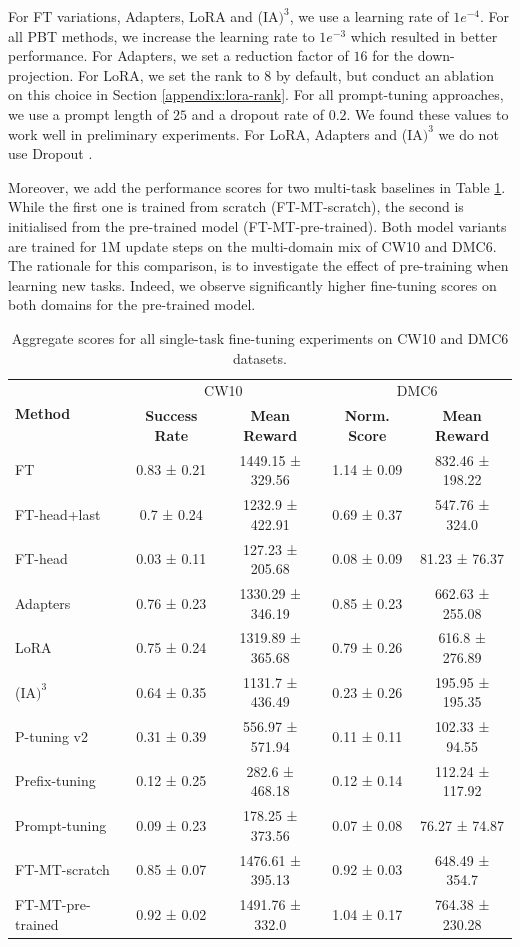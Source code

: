 For FT variations, Adapters, LoRA and (IA$\text{)}^3$, we use a learning rate of $1e^{-4}$. For all PBT methods, we increase the learning rate to $1e^{-3}$ which resulted in  better performance. For Adapters, we set a reduction factor of $16$ for the down-projection. For LoRA, we set the rank to 8 by default, but conduct an ablation on this choice in Section \ref{appendix:lora-rank}. For all prompt-tuning approaches, we use a prompt length of $25$ and a dropout rate of $0.2$. We found these values to work well in preliminary experiments. For LoRA, Adapters and (IA$\text{)}^3$ we do not use Dropout \citep{Srivastava:14}. 

Moreover, we add the performance scores for two multi-task baselines in Table \ref{tab:appendix-adapt-full}. While the first one is trained from scratch (FT-MT-scratch), the second is initialised from the pre-trained model (FT-MT-pre-trained). Both model variants are trained for 1M update steps on the multi-domain mix of CW10 and DMC6. The rationale for this comparison, is to investigate the effect of pre-training when learning new tasks. Indeed, we observe significantly higher fine-tuning scores on both domains for the pre-trained model.  

\begin{table}[]
    \centering
    \caption{Aggregate scores for all single-task fine-tuning experiments on CW10 and DMC6 datasets.}
    \begin{tabular}{l c c | c c}
    \toprule
    \multirow{2}{*}{\textbf{Method}} & \multicolumn{2}{c}{CW10} & \multicolumn{2}{c}{DMC6} \\
    &  \textbf{Success Rate} &  \textbf{Mean Reward} & \textbf{Norm. Score} & \textbf{Mean Reward} \\
    \midrule
    FT &  0.83 ± 0.21 & 1449.15 ± 329.56 &  1.14 ± 0.09 & 832.46 ± 198.22 \\
    FT-head+last &   0.7 ± 0.24 &  1232.9 ± 422.91 & 0.69 ± 0.37 &  547.76 ± 324.0 \\
    FT-head &  0.03 ± 0.11 &  127.23 ± 205.68 & 0.08 ± 0.09 &   81.23 ± 76.37 \\
    Adapters &  0.76 ± 0.23 & 1330.29 ± 346.19 & 0.85 ± 0.23 & 662.63 ± 255.08 \\
    LoRA &  0.75 ± 0.24 & 1319.89 ± 365.68 & 0.79 ± 0.26 &  616.8 ± 276.89 \\
    (IA$\text{)}^3$ &  0.64 ± 0.35 &  1131.7 ± 436.49 & 0.23 ± 0.26 & 195.95 ± 195.35 \\
    P-tuning v2 &  0.31 ± 0.39 &  556.97 ± 571.94 &  0.11 ± 0.11 &  102.33 ± 94.55 \\
    Prefix-tuning &  0.12 ± 0.25 &   282.6 ± 468.18 &  0.12 ± 0.14 & 112.24 ± 117.92 \\
    Prompt-tuning &  0.09 ± 0.23 &  178.25 ± 373.56 &  0.07 ± 0.08 &   76.27 ± 74.87 \\
    \midrule
    FT-MT-scratch  &  0.85 ± 0.07 & 1476.61 ± 395.13 &  0.92 ± 0.03 & 648.49 ± 354.7 \\
    FT-MT-pre-trained &  0.92 ± 0.02 & 1491.76 ± 332.0 &  1.04 ± 0.17 & 764.38 ± 230.28 \\
    \bottomrule
    \end{tabular}
    \label{tab:appendix-adapt-full}
\end{table}

